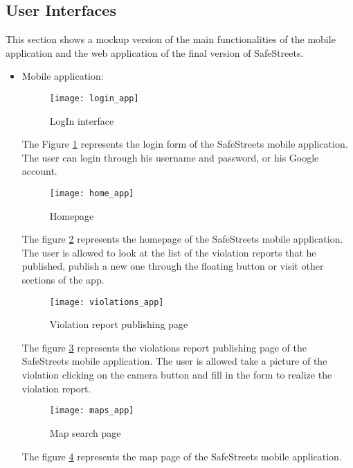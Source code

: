 \subsection{User Interfaces}
This section shows a mockup version of the main functionalities of the mobile application and the web application of the final version of SafeStreets.
\begin{itemize}
    \item Mobile application:
            \begin{figure}[H]
                \centering
                \texttt{[image: login\_app]}
                \caption{LogIn interface}
                \label{fig:login_app}
            \end{figure}
            The Figure \ref{fig:login_app} represents the login form of the SafeStreets
            mobile application. The user can login through his username
            and password, or his Google account.
            \begin{figure}[H]
                \centering
                \texttt{[image: home\_app]}
                \caption{Homepage}
                \label{fig:home_app}
            \end{figure}
            The figure \ref{fig:home_app} represents the homepage of the SafeStreets
            mobile application. The user is allowed to look at the list
            of the violation reports that he published, publish a new one
            through the floating button or visit other sections of the app.
            \begin{figure}[H]
                \centering
                \texttt{[image: violations\_app]}
                \caption{Violation report publishing page}
                \label{fig:violations_app}
            \end{figure}
            The figure \ref{fig:violations_app} represents the violations report
            publishing page of the SafeStreets mobile application. 
            The user is allowed take a picture of the violation clicking on the camera
            button and fill in the form to realize the violation report.
            \begin{figure}[H]
                \centering
                \texttt{[image: maps\_app]}
                \caption{Map search page}
                \label{fig:maps_app}
            \end{figure}
            The figure \ref{fig:maps_app} represents the map page of the SafeStreets mobile application. 

\end{itemize}
